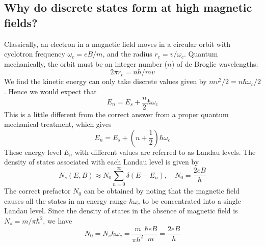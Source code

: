 \documentclass[11pt,a4paper]{book}
\theoremstyle{plain}
\theoremstyle{definition}
\theoremstyle{remark}
\begin{document}
\subsection{Why do discrete states form at high magnetic fields?}
Classically, an electron in a magnetic field moves in a circular orbit with cyclotron frequency $\omega_c = e B/m$, and the radius $r_c=v/\omega_c$. Quantum mechanically, the orbit must be an integer number ($n$) of de Broglie wavelengths:
\begin{equation}
    2\pi r_c = n h/m v
\end{equation}
We find the kinetic energy can only take discrete values given by $mv^2/2 = n\hbar \omega_c/2$. Hence we would expect that
\begin{equation}
    E_n = E_s +  \frac{n}{2} \hbar \omega_c  
\end{equation}
This is a little different from the correct answer from a proper quantum mechanical treatment, which gives
\begin{equation}    
    E_n = E_s + \left(n + \frac{1}{2}\right) \hbar \omega_c  
\end{equation}
These energy level $E_n$ with different values are referred to as Landau levels. The density of states associated with each Landau level is given by
\begin{equation}    
    N_s(E, B) \approx N_0 \sum_{n=0}^{\infty} \delta \left(E - E_n\right), \quad N_0 = \frac{2 e B}{h}  
\end{equation}
The correct prefactor $N_0$ can be obtained by noting that the magnetic field causes all the states in an energy range $\hbar \omega_c$ to be concentrated into a single Landau level. Since the density of states in the absence of magnetic field is $N_s = m/\pi \hbar^2$, we have
\begin{equation}    
    N_0 = N_s \hbar \omega_c = \frac{m}{\pi \hbar^2} \frac{\hbar e B}{m} = \frac{2 e B}{h}  
\end{equation}
\end{document}
